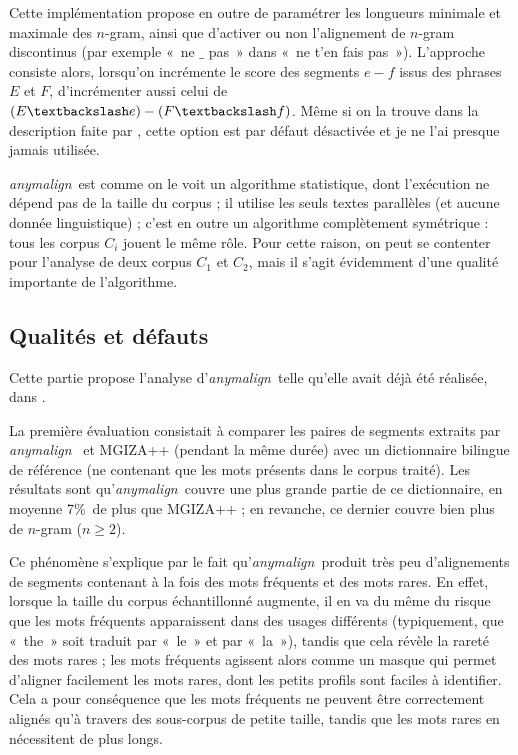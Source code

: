\documentclass[a4paper,10pt]{article}
\newcommand{\anym}{\emph{anymalign}}
\newcommand{\guill}[1]{«~#1~»}
\begin{document}
Cette implémentation propose en outre de paramétrer les longueurs minimale et maximale des $n$-gram, ainsi que d'activer ou non l'alignement de  $n$-gram discontinus (par exemple \guill{ne $\_$ pas} dans \guill{ne t'en fais pas}). L'approche consiste alors, lorsqu'on incrémente le score des segments $e-f$ issus des phrases $E$ et $F$, d'incrémenter aussi celui de $(E\textbackslash e)-(F\textbackslash f)$. Même si on la trouve dans la description faite par \cite{lardilleux2013generalizing}, cette option est par défaut désactivée et je ne l'ai presque jamais utilisée.

\anym~est comme on le voit un algorithme statistique, dont l'exécution ne dépend pas de la taille du corpus ; il  utilise les seuls textes parallèles (et aucune donnée linguistique) ; c'est en outre un algorithme complètement symétrique : tous les corpus $C_i$ jouent le même rôle. Pour cette raison, on peut se contenter pour l'analyse de deux corpus $C_1$ et $C_2$, mais il s'agit évidemment d'une qualité importante de l'algorithme.


\subsection{Qualités et défauts}

Cette partie propose l'analyse d'\anym~telle qu'elle avait déjà été réalisée, dans \cite{lardilleux2013generalizing}.

La première évaluation consistait à comparer les paires de segments extraits par \anym~ et MGIZA++ (pendant la même durée) avec un dictionnaire bilingue de référence (ne contenant que les mots présents dans le corpus traité). Les résultats sont qu'\anym~couvre une plus grande partie de ce dictionnaire, en moyenne 7\%~de plus que MGIZA++ ; en revanche, ce dernier couvre bien plus de $n$-gram ($n\geq2$).

Ce phénomène s'explique par le fait qu'\anym~produit très peu d'alignements de segments contenant à la fois des mots fréquents et des mots rares. En effet, lorsque la taille du corpus échantillonné augmente, il en va du même du risque que les mots fréquents apparaissent dans des usages différents (typiquement, que \guill{the} soit traduit par \guill{le} et par \guill{la}), tandis que cela révèle la rareté des mots rares ; les mots fréquents agissent alors comme un masque qui permet d'aligner facilement les mots rares, dont les petits profils sont faciles à identifier. Cela a pour conséquence que les mots fréquents ne peuvent être correctement alignés qu'à travers des sous-corpus de petite taille, tandis que les mots rares en nécessitent de plus longs. 
\end{document}
